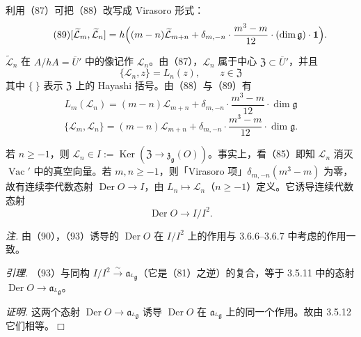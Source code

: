 利用（87）可把（88）改写成 Virasoro 形式：
\begin{equation}\tag{89}
[\widetilde{\mathcal{L}}_{m}, \widetilde{\mathcal{L}}_{n}] = h\Bigl((m-n)\widetilde{\mathcal{L}}_{m+n} + \delta_{m,-n}\cdot\frac{m^{3}-m}{12}\cdot(\dim\mathfrak{g})\cdot\mathbf{1}\Bigr).
\end{equation}

 $\widetilde{\mathcal{L}}_{n}$ 在 $A/hA = \overline{U}'$ 中的像记作 $\mathcal{L}_{n}$。由（87），$\mathcal{L}_{n}$ 属于中心 $\mathfrak{Z} \subset \overline{U}'$，并且
\begin{equation}\tag{90}
\{\mathcal{L}_{n}, z\} = L_{n}(z), \qquad z \in \mathfrak{Z}
\end{equation}
其中 $\{\ \}$ 表示 $\mathfrak{Z}$ 上的 Hayashi 括号。由（88）与（89）有
\begin{equation}\tag{91}
L_{m}(\mathcal{L}_{n}) = (m-n)\mathcal{L}_{m+n} + \delta_{m,-n}\cdot\frac{m^{3}-m}{12}\cdot\dim\mathfrak{g}
\end{equation}
\begin{equation}\tag{92}
\{\mathcal{L}_{m}, \mathcal{L}_{n}\} = (m-n)\mathcal{L}_{m+n} + \delta_{m,-n}\cdot\frac{m^{3}-m}{12}\cdot\dim\mathfrak{g}.
\end{equation}

 若 $n \ge -1$，则 $\mathcal{L}_{n} \in I := \operatorname{Ker}(\mathfrak{Z} \to \mathfrak{z}_{\mathfrak{g}}(O))$。事实上，看（85）即知 $\mathcal{L}_{n}$ 消灭 $\operatorname{Vac}'$ 中的真空向量。若 $m, n \ge -1$，则「Virasoro 项」$\delta_{m,-n}(m^{3}-m)$ 为零，故有连续李代数态射 $\operatorname{Der} O \to I$，由 $L_{n} \mapsto \mathcal{L}_{n}$（$n \ge -1$）定义。它诱导连续代数态射
\begin{equation}\tag{93}
\operatorname{Der} O \to I/I^{2}.
\end{equation}


\emph{注.} 由（90），（93）诱导的 $\operatorname{Der} O$ 在 $I/I^{2}$ 上的作用与 3.6.6--3.6.7 中考虑的作用一致。

 \emph{引理.} （93）与同构 $I/I^{2} \xrightarrow{\sim} \mathfrak{a}_{{}^{L}\mathfrak{g}}$（它是（81）之逆）的复合，等于 3.5.11 中的态射 $\operatorname{Der} O \to \mathfrak{a}_{{}^{L}\mathfrak{g}}$。

\emph{证明.} 这两个态射 $\operatorname{Der} O \to \mathfrak{a}_{{}^{L}\mathfrak{g}}$ 诱导 $\operatorname{Der} O$ 在 $\mathfrak{a}_{{}^{L}\mathfrak{g}}$ 上的同一个作用。故由 3.5.12 它们相等。\hfill$\Box$

